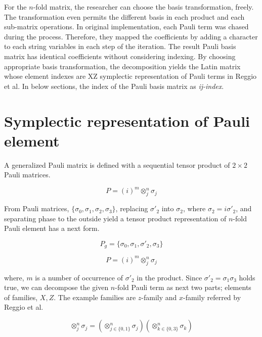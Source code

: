 \documentclass[twocolumn]{article}
\begin{document}
For the $n$-fold matrix, the researcher can choose the basis transformation, freely.
The transformation even permits the different basis in each product and each sub-matrix
operations. 
In original implementation, each Pauli term was chased during the process. 
Therefore, they mapped the coefficients by adding a character to each string variables 
in each step of the iteration. 
The result Pauli basis matrix has identical coefficients without considering indexing.
By choosing appropriate basis transformation, the decomposition yields the Latin matrix whose element indexes are XZ symplectic representation
of Pauli terms in Reggio et al\cite{reggio_fast_2023}.
In below sections, the index of the Pauli basis matrix as \textit{ij-index}.

\section{Symplectic representation of Pauli element}

A generalized Pauli matrix is defined with a sequential tensor product of 
$2\times 2$ Pauli matrices.

\begin{equation}
    P = (i)^m \otimes_j^n \sigma_j
\end{equation}

From Pauli matrices, $\{\sigma_0, \sigma_1, \sigma_2, \sigma_3\}$, replacing $\sigma'_2$ into $\sigma_2$, where $\sigma_2 = i \sigma'_2$,
and separating phase to the outside yield
a tensor product representation of $n$-fold Pauli element has a next form.

\begin{equation}
    P_{g} = \{\sigma_0 , \sigma_1, \sigma'_2, \sigma_3\}
\end{equation}

\begin{equation}
    P = (i)^m \otimes_j^n \sigma_j
\end{equation}

where, $m$ is a number of occurrence of $\sigma'_2$ in the product.
Since $\sigma'_2 = \sigma_1 \sigma_3$ holds true, we can decompose the given $n$-fold Pauli term as next two
parts; elements of families, $X, Z$. 
The example families are $z$-family and $x$-family referred by Reggio et al\cite{reggio_fast_2023}.

\begin{equation}
    \label{eq:xz_decompose}
    \otimes_j^n \sigma_j = \left( \otimes_{j \in \{0, 1\}}^n \sigma_j \right) \left( \otimes_{k \in \{0, 3\}}^n \sigma_k \right)
\end{equation}
\end{document}
